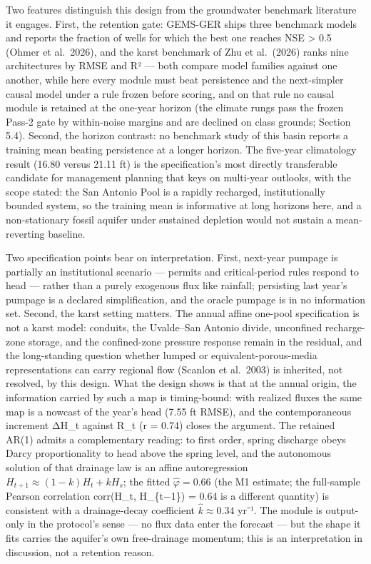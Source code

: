 \documentclass[11pt]{article}
\begin{document}
Two features distinguish this design from the groundwater benchmark
literature it engages. First, the retention gate: GEMS-GER ships three
benchmark models and reports the fraction of wells for which the best
one reaches NSE \textgreater{} 0.5 (Ohmer et al.~2026), and the karst
benchmark of Zhu et al.~(2026) ranks nine architectures by RMSE and R²
--- both compare model families against one another, while here every
module must beat persistence and the next-simpler causal model under a
rule frozen before scoring, and on that rule no causal module is
retained at the one-year horizon (the climate rungs pass the frozen
Pass-2 gate by within-noise margins and are declined on class grounds;
Section 5.4). Second, the horizon contrast: no benchmark study of this
basin reports a training mean beating persistence at a longer horizon.
The five-year climatology result (16.80 versus 21.11 ft) is the
specification's most directly transferable candidate for management
planning that keys on multi-year outlooks, with the scope stated: the
San Antonio Pool is a rapidly recharged, institutionally bounded system,
so the training mean is informative at long horizons here, and a
non-stationary fossil aquifer under sustained depletion would not
sustain a mean-reverting baseline.

Two specification points bear on interpretation. First, next-year
pumpage is partially an institutional scenario --- permits and
critical-period rules respond to head --- rather than a purely exogenous
flux like rainfall; persisting last year's pumpage is a declared
simplification, and the oracle pumpage is in no information set. Second,
the karst setting matters. The annual affine one-pool specification is
not a karst model: conduits, the Uvalde--San Antonio divide, unconfined
recharge-zone storage, and the confined-zone pressure response remain in
the residual, and the long-standing question whether lumped or
equivalent-porous-media representations can carry regional flow (Scanlon
et al.~2003) is inherited, not resolved, by this design. What the design
shows is that at the annual origin, the information carried by such a
map is timing-bound: with realized fluxes the same map is a nowcast of
the year's head (7.55 ft RMSE), and the contemporaneous increment ΔH\_t
against R\_t (r = 0.74) closes the argument. The retained AR(1) admits a
complementary reading: to first order, spring discharge obeys Darcy
proportionality to head above the spring level, and the autonomous
solution of that drainage law is an affine autoregression
\(H_{t+1} \approx (1-k)H_t + k H_s\); the fitted \(\hat\varphi = 0.66\)
(the M1 estimate; the full-sample Pearson correlation corr(H\_t,
H\_\{t−1\}) = 0.64 is a different quantity) is consistent with a
drainage-decay coefficient \(\hat k \approx 0.34\) yr⁻¹. The module is
output-only in the protocol's sense --- no flux data enter the forecast
--- but the shape it fits carries the aquifer's own free-drainage
momentum; this is an interpretation in discussion, not a retention
reason.
\end{document}

